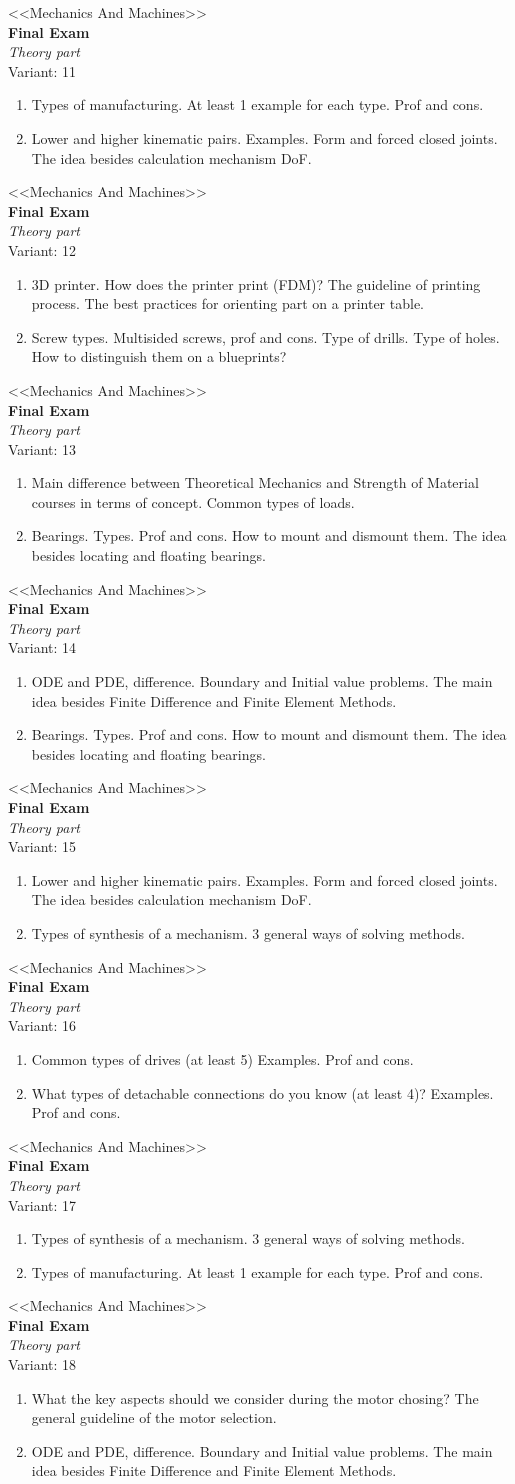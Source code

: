 \documentclass[12pt]{article}
\newcommand\ttask[2]{
	\begin{center}
		\LARGE <<Mechanics And Machines>> \\ \textbf{Final Exam} \\ \textit{Theory part} \\ Variant: #1
	\end{center}
#2
}
\def\introTM{Lower and higher kinematic pairs. Examples. Form and forced closed joints. The idea besides calculation mechanism DoF.}
\def\typeD{Common types of drives (at least 5) Examples. Prof and cons.}
\def\SPM{Types of synthesis of a mechanism. 3 general ways of solving methods.}
\def\MS{What the key aspects should we consider during the motor chosing? The general guideline of the motor selection.}
\def\LJC{What types of detachable connections do you know (at least 4)? Examples. Prof and cons.}
\def\LJCCC{Bearings. Types. Prof and cons. How to mount and dismount them. The idea besides locating and floating bearings.}
\def\CD{Screw types. Multisided screws, prof and cons. Type of drills. Type of holes. How to distinguish them on a blueprints?}
\def\DTM{Types of manufacturing. At least 1 example for each type. Prof and cons.}
\def\BP{3D printer. How does the printer print (FDM)? The guideline of printing process. The best practices for orienting part on a printer table.}
\def\SoM{Main difference between Theoretical Mechanics and Strength of Material courses in terms of concept. Common types of loads.}
\def\FDM{ODE and PDE, difference. Boundary and Initial value problems. The main idea besides Finite Difference and Finite Element Methods.}
\begin{document}
\ttask{11}{\begin{enumerate}
	\item \DTM
	\item \introTM
\end{enumerate}}

\ttask{12}{\begin{enumerate}
	\item \BP
	\item \CD
\end{enumerate}}

\ttask{13}{\begin{enumerate}
	\item \SoM
	\item \LJCCC
\end{enumerate}}

\ttask{14}{\begin{enumerate}
	\item \FDM
	\item \LJCCC
\end{enumerate}}

\ttask{15}{\begin{enumerate}
	\item \introTM
	\item \SPM
\end{enumerate}}

\ttask{16}{\begin{enumerate}
	\item \typeD
	\item \LJC
\end{enumerate}}

\ttask{17}{\begin{enumerate}
	\item \SPM
	\item \DTM
\end{enumerate}}

\ttask{18}{\begin{enumerate}
	\item \MS
	\item \FDM
\end{enumerate}}
\end{document}
